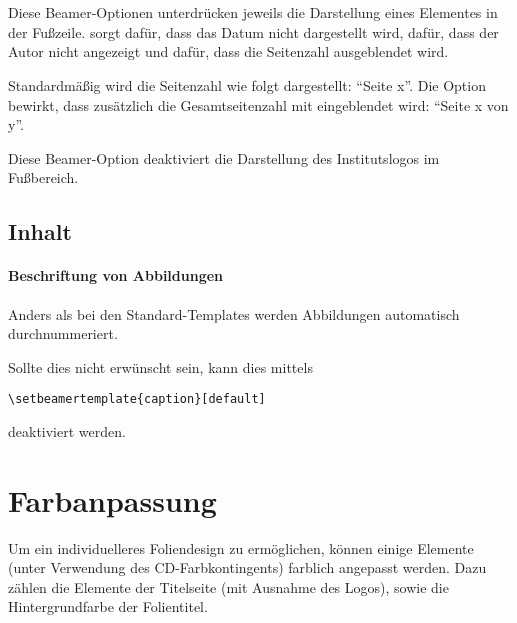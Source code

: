 \begin{Declaration}
  \\
  \\
\end{Declaration}

Diese Beamer-Optionen unterdrücken jeweils die Darstellung eines Elementes in der Fußzeile.
 sorgt dafür, dass das Datum nicht dargestellt wird,
 dafür, dass der Autor nicht angezeigt und
 dafür, dass die Seitenzahl ausgeblendet wird.

\begin{Declaration}
\end{Declaration}

Standardmäßig wird die Seitenzahl wie folgt dargestellt: "`Seite x"'.
Die Option  bewirkt, dass zusätzlich die Gesamtseitenzahl
mit eingeblendet wird: "`Seite x von y"'.

\begin{Declaration}
\end{Declaration}

Diese Beamer-Option deaktiviert die Darstellung des Institutslogos im Fußbereich.

\subsection{Inhalt}

\paragraph{Beschriftung von Abbildungen}

Anders als bei den Standard-Templates werden Abbildungen
automatisch durchnummeriert.

Sollte dies nicht erwünscht sein, kann dies mittels
\begin{lstlisting}
\setbeamertemplate{caption}[default]
\end{lstlisting}
deaktiviert werden.

\section{Farbanpassung}\label{beamer:sec:color}

Um ein individuelleres Foliendesign zu ermöglichen, können einige Elemente
(unter Verwendung des CD-Farbkontingents)
farblich angepasst werden.
Dazu zählen die Elemente der Titelseite (mit Ausnahme des Logos),
sowie die Hintergrundfarbe der Folientitel.

